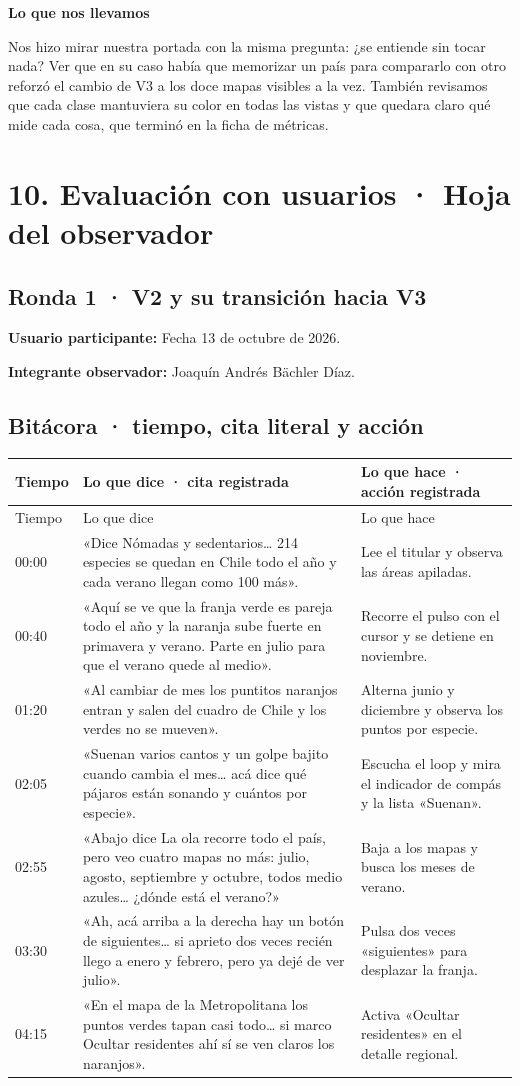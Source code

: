\documentclass[11pt,a4paper]{article}
\newcommand{\campo}[1]{\par\needspace{3\baselineskip}\textbf{#1}\par\nopagebreak}
\newcommand{\seccion}[1]{\clearpage\section*{#1}}
\begin{document}
\campo{Lo que nos llevamos}
Nos hizo mirar nuestra portada con la misma pregunta: ¿se entiende sin tocar nada? Ver que en su caso había que memorizar un país para compararlo con otro reforzó el cambio de V3 a los doce mapas visibles a la vez. También revisamos que cada clase mantuviera su color en todas las vistas y que quedara claro qué mide cada cosa, que terminó en la ficha de métricas.


\seccion{10. Evaluación con usuarios · Hoja del observador}
\subsection*{Ronda 1 · V2 y su transición hacia V3}

\textbf{Usuario participante:} Fecha 13 de octubre de 2026.\par
\textbf{Integrante observador:} Joaquín Andrés Bächler Díaz.

\subsection*{Bitácora · tiempo, cita literal y acción}
{\small
\begin{longtable}{@{}p{12mm}p{77mm}p{65mm}@{}}
\toprule
Tiempo & Lo que dice · cita registrada & Lo que hace · acción registrada\\
\midrule
\endfirsthead
\toprule Tiempo & Lo que dice & Lo que hace\\\midrule
\endhead
00:00 & «Dice Nómadas y sedentarios\ldots{} 214 especies se quedan en Chile todo el año y cada verano llegan como 100 más». & Lee el titular y observa las áreas apiladas.\\[4pt]
00:40 & «Aquí se ve que la franja verde es pareja todo el año y la naranja sube fuerte en primavera y verano. Parte en julio para que el verano quede al medio». & Recorre el pulso con el cursor y se detiene en noviembre.\\[4pt]
01:20 & «Al cambiar de mes los puntitos naranjos entran y salen del cuadro de Chile y los verdes no se mueven». & Alterna junio y diciembre y observa los puntos por especie.\\[4pt]
02:05 & «Suenan varios cantos y un golpe bajito cuando cambia el mes\ldots{} acá dice qué pájaros están sonando y cuántos por especie». & Escucha el loop y mira el indicador de compás y la lista «Suenan».\\[4pt]
02:55 & «Abajo dice La ola recorre todo el país, pero veo cuatro mapas no más: julio, agosto, septiembre y octubre, todos medio azules\ldots{} ¿dónde está el verano?» & Baja a los mapas y busca los meses de verano.\\[4pt]
03:30 & «Ah, acá arriba a la derecha hay un botón de siguientes\ldots{} si aprieto dos veces recién llego a enero y febrero, pero ya dejé de ver julio». & Pulsa dos veces «siguientes» para desplazar la franja.\\[4pt]
04:15 & «En el mapa de la Metropolitana los puntos verdes tapan casi todo\ldots{} si marco Ocultar residentes ahí sí se ven claros los naranjos». & Activa «Ocultar residentes» en el detalle regional.\\
\bottomrule
\end{longtable}}
\end{document}
